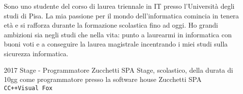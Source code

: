 \documentclass[9pt]{developercv} %
\begin{document}
\vspace{0.5cm}



\begin{minipage}[t]{0.4\textwidth} %
	\vspace{-\baselineskip} %

	Sono uno studente del corso di laurea triennale in IT presso l'Università degli studi di Pisa. La mia passione per il mondo dell'informatica
	comincia in tenera età e si rafforza durante la formazione scolastica fino ad oggi.	Ho grandi ambizioni sia negli studi che nella vita: punto a laurearmi in informatica con buoni voti e a conseguire la laurea magistrale incentrando i miei studi
	sulla sicurezza informatica.\\
\end{minipage}
\hfill %
\begin{minipage}[t]{0.5\textwidth} %
	\vspace{-\baselineskip} %
\end{minipage}




\begin{entrylist}
	\entry
	{2017}
	{Stage - Programmatore}
	{Zucchetti SPA}
	{Stage, scolastico, della durata di 10gg come programmatore presso la software house Zucchetti SPA\\ \texttt{C}\slashsep\texttt{C++}\slashsep\texttt{Visual Fox}}
\end{entrylist}

\end{document}
